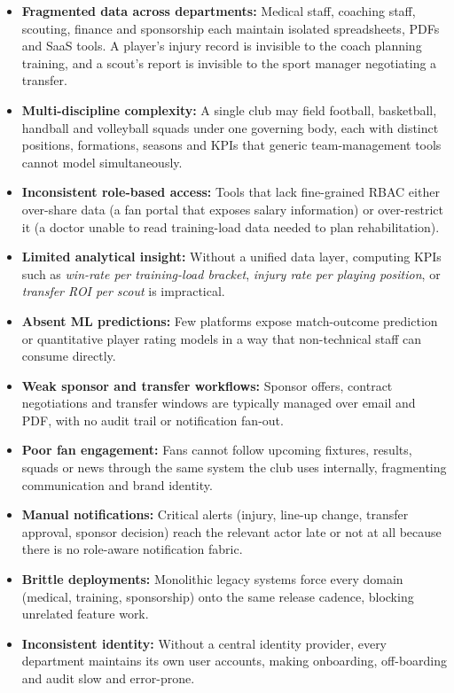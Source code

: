 \documentclass[12pt,a4paper,oneside]{report}
\begin{document}
\begin{itemize}[leftmargin=*]
  \item \textbf{Fragmented data across departments:} Medical staff,
        coaching staff, scouting, finance and sponsorship each maintain
        isolated spreadsheets, PDFs and SaaS tools. A player's injury
        record is invisible to the coach planning training, and a
        scout's report is invisible to the sport manager negotiating
        a transfer.
  \item \textbf{Multi-discipline complexity:} A single club may field
        football, basketball, handball and volleyball squads under one
        governing body, each with distinct positions, formations,
        seasons and KPIs that generic team-management tools cannot
        model simultaneously.
  \item \textbf{Inconsistent role-based access:} Tools that lack
        fine-grained RBAC either over-share data (a fan portal that
        exposes salary information) or over-restrict it (a doctor
        unable to read training-load data needed to plan rehabilitation).
  \item \textbf{Limited analytical insight:} Without a unified data
        layer, computing KPIs such as \emph{win-rate per training-load
        bracket}, \emph{injury rate per playing position}, or
        \emph{transfer ROI per scout} is impractical.
  \item \textbf{Absent ML predictions:} Few platforms expose
        match-outcome prediction or quantitative player rating models
        in a way that non-technical staff can consume directly.
  \item \textbf{Weak sponsor and transfer workflows:} Sponsor offers,
        contract negotiations and transfer windows are typically
        managed over email and PDF, with no audit trail or
        notification fan-out.
  \item \textbf{Poor fan engagement:} Fans cannot follow upcoming
        fixtures, results, squads or news through the same system the
        club uses internally, fragmenting communication and brand
        identity.
  \item \textbf{Manual notifications:} Critical alerts (injury, line-up
        change, transfer approval, sponsor decision) reach the relevant
        actor late or not at all because there is no role-aware
        notification fabric.
  \item \textbf{Brittle deployments:} Monolithic legacy systems force
        every domain (medical, training, sponsorship) onto the same
        release cadence, blocking unrelated feature work.
  \item \textbf{Inconsistent identity:} Without a central identity
        provider, every department maintains its own user accounts,
        making onboarding, off-boarding and audit slow and error-prone.
\end{itemize}
\end{document}
